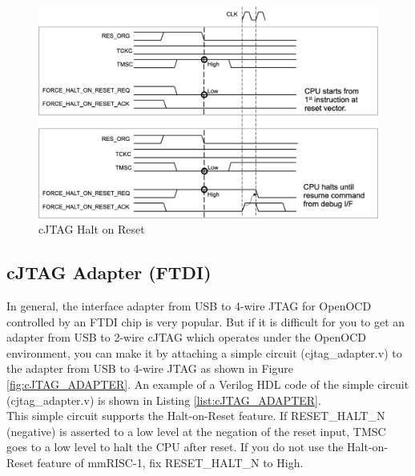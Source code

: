 \begin{figure}[H]
    \includegraphics[width=0.9\columnwidth]{./Figure/cJTAG_HALT_ON_RESET.png}
    \caption{cJTAG Halt on Reset}
    \label{fig:cJTAG_HALT_ON_RESET}
\end{figure}

\subsection{cJTAG Adapter (FTDI)}
\label{sec:cJTAG_ADAPTER}

In general, the interface adapter from USB to 4-wire JTAG for OpenOCD controlled by an FTDI chip is very popular. But if it is difficult for you to get an adapter from USB to 2-wire cJTAG which operates under the OpenOCD environment, you can make it by attaching a simple circuit (cjtag\_adapter.v) to the adapter from USB to 4-wire JTAG as shown in Figure \ref{fig:cJTAG_ADAPTER}. An example of a Verilog HDL code of the simple circuit (cjtag\_adapter.v) is shown in Listing \ref{list:cJTAG_ADAPTER}.\\

This simple circuit supports the Halt-on-Reset feature. If RESET\_HALT\_N (negative) is asserted to a low level at the negation of the reset input, TMSC goes to a low level to halt the CPU after reset. If you do not use the Halt-on-Reset feature of mmRISC-1, fix RESET\_HALT\_N to High.\\

